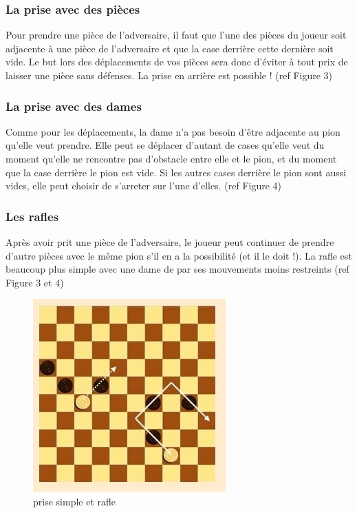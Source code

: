 \documentclass{article}
\begin{document}
    \subsubsection{La prise avec des pièces}
        Pour prendre une pièce de l'adversaire, il faut que l'une des pièces du joueur soit adjacente à une pièce de l'adversaire et que
        la case derrière cette dernière soit vide. Le but lors des déplacements de vos pièces sera donc d'éviter à tout prix de laisser
        une pièce sans défenses. La prise en arrière est possible ! (ref Figure 3)

    \subsubsection{La prise avec des dames}
        Comme pour les déplacements, la dame n'a pas besoin d'être adjacente au pion qu'elle veut prendre. Elle peut se déplacer
        d'autant de cases qu'elle veut du moment qu'elle ne rencontre pas d'obstacle entre elle et le pion, et du moment que la case
        derrière le pion est vide. Si les autres cases derrière le pion sont aussi vides, elle peut choisir de s'arreter sur l'une d'elles.
        (ref Figure 4)

    \subsubsection{Les rafles}
        Après avoir prit une pièce de l'adversaire, le joueur peut continuer de prendre d'autre pièces avec le même pion s'il en a la possibilité
        (et il le doit !). La rafle est beaucoup plus simple avec une dame de par ses mouvements moins restreints (ref Figure 3 et 4)

        \begin{figure}[!htp]
            \centerline{\includegraphics[scale=0.5]{images/prises.jpg}}
            \caption{\label{étiquette} prise simple et rafle}
        \end{figure}
\end{document}
